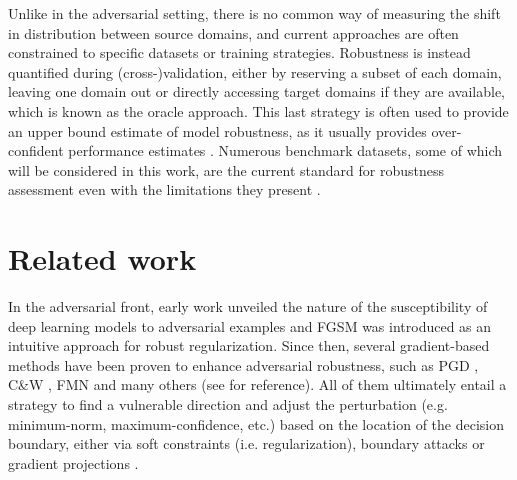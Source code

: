 Unlike in the adversarial setting, there is no common way of measuring
the shift in distribution between source domains, and current approaches
are often constrained to specific datasets or training strategies. 
Robustness is instead quantified during (cross-)validation, either by reserving
a subset of each domain, leaving one domain out or
directly accessing target domains if they are available, 
which is known as the oracle approach. This last strategy is often
used to provide an upper bound estimate of model robustness, 
as it usually provides over-confident performance estimates
\cite{zhouDomainGeneralizationSurvey2022}.
Numerous benchmark datasets, some of which will be considered in this work, are the current 
standard for robustness assessment even with
the limitations they present
\cite{kohWILDSBenchmarkIntheWild2021}. 
\\


\section{Related work}

In the adversarial front, early work 
\cite{szegedyIntriguingPropertiesNeural2014}
unveiled the nature of the susceptibility of deep learning 
models to adversarial examples and FGSM 
\cite{goodfellowExplainingHarnessingAdversarial2015}
was introduced as an intuitive
approach for robust regularization. 
Since then, several gradient-based methods have been
proven to enhance adversarial robustness, such as PGD
\cite{madryDeepLearningModels2019}, C\&W 
\cite{carliniEvaluatingRobustnessNeural2017},
FMN
\cite{pintorFastMinimumnormAdversarial2021} and
many others (see 
\cite{liReviewAdversarialAttack2022} for reference). 
All of them ultimately entail a strategy to find
a vulnerable direction and adjust the perturbation 
(e.g. minimum-norm, maximum-confidence, etc.)
based on the location of the decision boundary, either via soft
constraints (i.e. regularization), boundary attacks or gradient
projections
\cite{baiRecentAdvancesAdversarial2021}. \\

